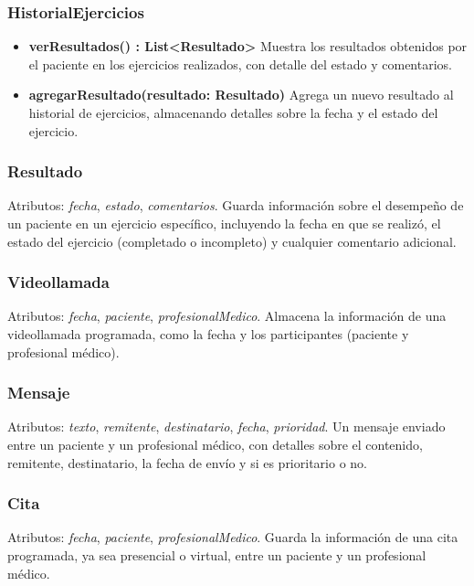 \documentclass{article}
\begin{document}
\subsubsection*{HistorialEjercicios}
\begin{itemize}
	\item \textbf{verResultados() : List<Resultado>}  
	Muestra los resultados obtenidos por el paciente en los ejercicios realizados, con detalle del estado y comentarios.
	
	\item \textbf{agregarResultado(resultado: Resultado)}  
	Agrega un nuevo resultado al historial de ejercicios, almacenando detalles sobre la fecha y el estado del ejercicio.
\end{itemize}

\subsubsection*{Resultado}
Atributos: \textit{fecha}, \textit{estado}, \textit{comentarios}.  
Guarda información sobre el desempeño de un paciente en un ejercicio específico, incluyendo la fecha en que se realizó, el estado del ejercicio (completado o incompleto) y cualquier comentario adicional.

\subsubsection*{Videollamada}
Atributos: \textit{fecha}, \textit{paciente}, \textit{profesionalMedico}.  
Almacena la información de una videollamada programada, como la fecha y los participantes (paciente y profesional médico).

\subsubsection*{Mensaje}
Atributos: \textit{texto}, \textit{remitente}, \textit{destinatario}, \textit{fecha}, \textit{prioridad}.  
Un mensaje enviado entre un paciente y un profesional médico, con detalles sobre el contenido, remitente, destinatario, la fecha de envío y si es prioritario o no.

\subsubsection*{Cita}
Atributos: \textit{fecha}, \textit{paciente}, \textit{profesionalMedico}.  
Guarda la información de una cita programada, ya sea presencial o virtual, entre un paciente y un profesional médico.
\end{document}

